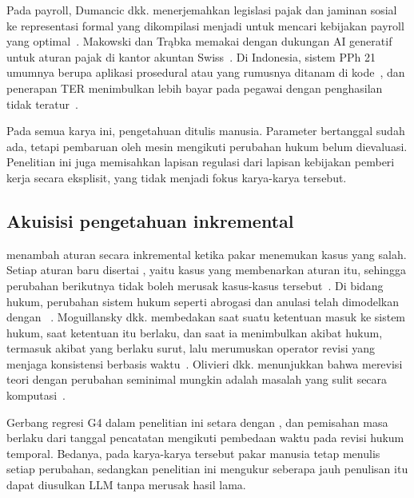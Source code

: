 Pada payroll, Dumancic dkk. menerjemahkan legislasi pajak dan jaminan sosial ke representasi formal yang dikompilasi menjadi  untuk mencari kebijakan payroll yang optimal~\cite{dumancic2021payroll}. Makowski dan Tr\k{a}bka memakai  dengan dukungan AI generatif untuk aturan pajak di kantor akuntan Swiss~\cite{makowski2025dmn}. Di Indonesia, sistem PPh 21 umumnya berupa aplikasi prosedural atau  yang rumusnya ditanam di kode~\cite{ramadhani2021grossup,yulistyawati2022payroll,kusuma2026pph21}, dan penerapan TER menimbulkan lebih bayar pada pegawai dengan penghasilan tidak teratur~\cite{sherra2025ter}.

Pada semua karya ini, pengetahuan ditulis manusia. Parameter bertanggal sudah ada, tetapi pembaruan  oleh mesin mengikuti perubahan hukum belum dievaluasi. Penelitian ini juga memisahkan lapisan regulasi dari lapisan kebijakan pemberi kerja secara eksplisit, yang tidak menjadi fokus karya-karya tersebut.

\subsection{Akuisisi pengetahuan inkremental}
\label{subsec:inkremental}

 menambah aturan secara inkremental ketika pakar menemukan kasus yang salah. Setiap aturan baru disertai , yaitu kasus yang membenarkan aturan itu, sehingga perubahan berikutnya tidak boleh merusak kasus-kasus tersebut~\cite{compton1990philosophical,compton2021rippledown}. Di bidang hukum, perubahan sistem hukum seperti abrogasi dan anulasi telah dimodelkan dengan ~\cite{governatori2010changing}. Moguillansky dkk. membedakan saat suatu ketentuan masuk ke sistem hukum, saat ketentuan itu berlaku, dan saat ia menimbulkan akibat hukum, termasuk akibat yang berlaku surut, lalu merumuskan operator revisi yang menjaga konsistensi berbasis waktu~\cite{moguillansky2024temporalised}. Olivieri dkk. menunjukkan bahwa merevisi teori  dengan perubahan seminimal mungkin adalah masalah yang sulit secara komputasi~\cite{olivieri2025revising}.

Gerbang regresi G4 dalam penelitian ini setara dengan , dan pemisahan masa berlaku dari tanggal pencatatan mengikuti pembedaan waktu pada revisi hukum temporal. Bedanya, pada karya-karya tersebut pakar manusia tetap menulis setiap perubahan, sedangkan penelitian ini mengukur seberapa jauh penulisan itu dapat diusulkan LLM tanpa merusak hasil lama.


